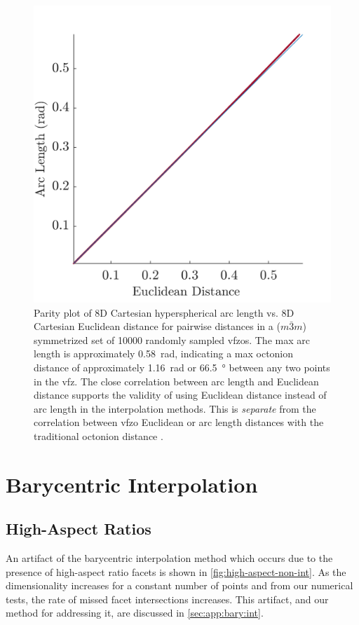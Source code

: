 \documentclass[preprint,12pt]{elsarticle}
\begin{document}
\begin{figure}[h!]
\centering
\includegraphics[scale=1]{dist-parity.png}
\caption{Parity plot of 8D Cartesian hyperspherical arc length vs. 8D Cartesian Euclidean distance for pairwise distances in a ($m\bar{3}m$) symmetrized set of \num{10000} randomly sampled \glspl{vfzo}. The max arc length is approximately \SI{0.58}{\radian}, indicating a max octonion distance of approximately \SI{1.16}{\radian} or \SI{66.5}{\degree} between any two points in the \gls{vfz}. The close correlation between arc length and Euclidean distance supports the validity of using Euclidean distance instead of arc length in the interpolation methods. This is \textit{separate} from the correlation between \gls{vfzo} Euclidean or arc length distances with the traditional octonion distance \cite{chesserLearningGrainBoundary2020}.}
\label{fig:dist-parity}
\end{figure}

\section{Barycentric Interpolation}
\label{sec:supp:bary}

\subsection{High-Aspect Ratios}
\label{sec:supp:bary:artifact}
An artifact of the barycentric interpolation method which occurs due to the presence of high-aspect ratio facets is shown in \cref{fig:high-aspect-non-int}. As the dimensionality increases for a constant number of points and from our numerical tests, the rate of missed facet intersections increases. This artifact, and our method for addressing it, are discussed in \cref{sec:app:bary:int}.
\end{document}
